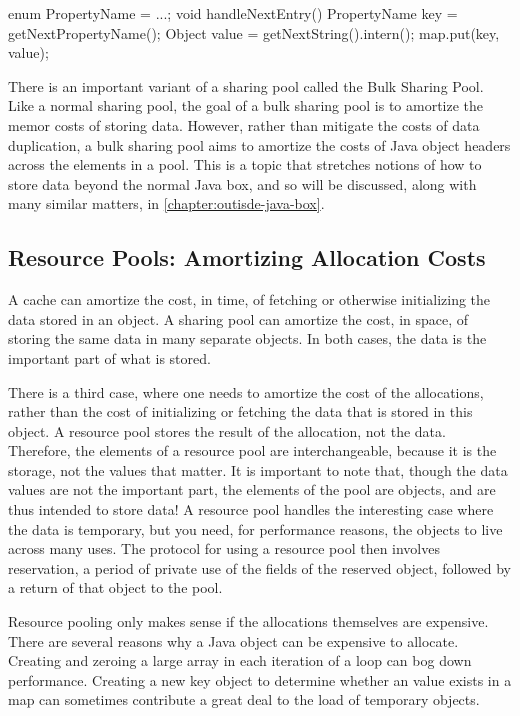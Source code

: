 \begin{shortlisting}
enum PropertyName = {...};
void handleNextEntry() {
	PropertyName key = getNextPropertyName();
	Object value = getNextString().intern();
	map.put(key, value);
}
\end{shortlisting} 

There is an important variant of a sharing pool called the Bulk Sharing Pool.
Like a normal sharing pool, the goal of a bulk sharing pool is to amortize the
memor costs of storing data. However, rather than mitigate the costs of data
duplication, a bulk sharing pool aims to amortize the costs of Java object
headers across the elements in a pool. This is a topic that stretches notions of
how to store data beyond the normal Java box, and so will be discussed, along
with many similar matters, in \autoref{chapter:outisde-java-box}.

\subsection{Resource Pools: Amortizing Allocation Costs}
\label{sec:resource-pools}

A cache can amortize the cost, in time, of fetching or otherwise initializing the
data stored in an object. A sharing pool can amortize the cost, in space, of
storing the same data in many separate objects. In both cases, the data is the
important part of what is stored.

 There is a third case,
where one needs to amortize the cost of the allocations, rather than the cost of
initializing or fetching the data that is stored in this object. A resource pool
stores the result of the allocation, not the data. Therefore, the elements of a
resource pool are interchangeable, because it is the storage, not the values that
matter. It is important to note that, though the data values are not the
important part, the elements of the pool are objects, and are thus intended to
store data! A resource pool handles the interesting case where the data is
temporary, but you need, for performance reasons, the objects to live across many
uses. The protocol for using a resource pool then involves reservation, a period
of private use of the fields of the reserved object, followed by a return of that
object to the pool.

Resource pooling only makes sense if the allocations themselves are expensive.
There are several reasons why a Java object can be expensive to allocate.
Creating and zeroing a large array in each iteration of a
loop can bog down performance. Creating a new key object to determine whether an
value exists in a map can sometimes contribute a great deal to the load of
temporary objects.

